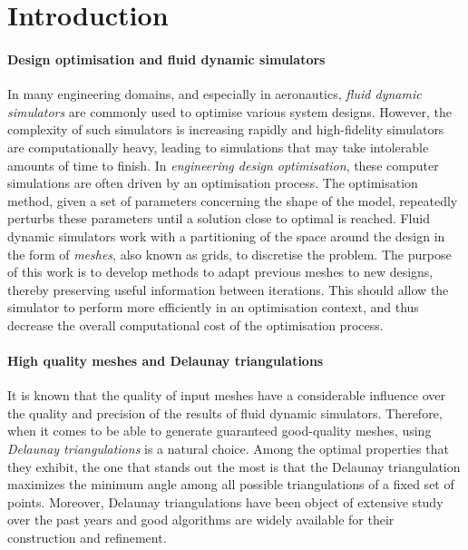 \section{Introduction}

\paragraph{Design optimisation and fluid dynamic simulators} In many engineering domains, and especially in aeronautics, \textit{fluid dynamic simulators} are commonly used to optimise various system designs. However, the complexity of such simulators is increasing rapidly and high-fidelity simulators are computationally heavy, leading to simulations that may take intolerable amounts of time to finish. In \textit{engineering design optimisation}, these computer simulations are often driven by an optimisation process. The optimisation method, given a set of parameters concerning the shape of the model, repeatedly perturbs these parameters until a solution close to optimal is reached.
Fluid dynamic simulators work with a partitioning of the space around the design in the form of \textit{meshes}, also known as grids, to discretise the problem. The purpose of this work is to develop methods to adapt previous meshes to new designs, thereby preserving useful information between iterations. This should allow the simulator to perform more efficiently in an optimisation context, and thus decrease the overall computational cost of the optimisation process.

\paragraph{High quality meshes and Delaunay triangulations} It is known that the quality of input meshes have a considerable influence over the quality and precision of the results of fluid dynamic simulators. Therefore, when it comes to be able to generate guaranteed good-quality meshes, using \textit{Delaunay triangulations} is a natural choice. Among the optimal properties that they exhibit, the one that stands out the most is that the Delaunay triangulation maximizes the minimum angle among all possible triangulations of a fixed set of points. Moreover, Delaunay triangulations have been object of extensive study over the past years and good algorithms are widely available for their construction and refinement.

